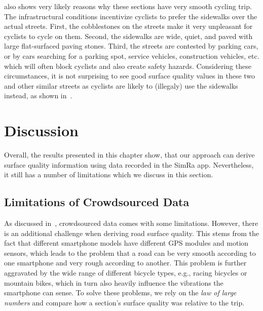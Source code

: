  also shows very likely reasons why these sections have very smooth cycling trip.
The infrastructural conditions incentivize cyclists to prefer the sidewalks over the actual streets.
First, the cobblestones on the streets make it very unpleasant for cyclists to cycle on them.
Second, the sidewalks are wide, quiet, and paved with large flat-surfaced paving stones.
Third, the streets are contested by parking cars, or by cars searching for a parking spot, service vehicles, construction vehicles, etc. which will often block cyclists and also create safety hazards.
Considering these circumstances, it is not surprising to see good surface quality values in these two and other similar streets as cyclists are likely to (illegaly) use the sidewalks instead, as shown in~.

\begin{table}%
\centering
\caption{Surface Quality Analysis Evaluation Results Showing Mean, Median and Standard Deviation of Sections With (Seemingly) Confusing Results}%
\label{tab:mismatch}
\end{table}

\section{Discussion}
\label{sec:discussion_cyclequality}
Overall, the results presented in this chapter show, that our approach can derive surface quality information using data recorded in the SimRa app.
Nevertheless, it still has a number of limitations which we discuss in this section.

\subsection{Limitations of Crowdsourced Data}
\label{subsec:limitation_of_crowdsourced_data}
As discussed in~, crowdsourced data comes with some limitations.
However, there is an additional challenge when deriving road surface quality.
This stems from the fact that different smartphone models have different GPS modules and motion sensors, which leads to the problem that a road can be very smooth according to one smartphone and very rough according to another.
This problem is further aggravated by the wide range of different bicycle types, e.g., racing bicycles or mountain bikes, which in turn also heavily influence the vibrations the smartphone can sense.
To solve these problems, we rely on the \textit{law of large numbers} and compare how a section's surface quality was relative to the trip. 

